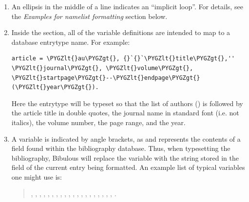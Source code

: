 \documentclass[letterpaper,10pt,english]{sphinxmanual}
\def\PYGZlt{\char`\<}
\def\PYGZgt{\char`\>}
\begin{document}
\begin{enumerate}
\item {} 
An ellipsis in the middle of a line indicates an ``implicit loop''. For details, see the \emph{Examples for namelist formatting} section below.

\item {} 
Inside the  section, all of the variable definitions are intended to map to a database entrytype name. For example:

\begin{Verbatim}[commandchars=\\\{\}]
article = \PYGZlt{}au\PYGZgt{}, {}`{}`\PYGZlt{}title\PYGZgt{},'' \PYGZlt{}journal\PYGZgt{}, \PYGZlt{}volume\PYGZgt{}, \PYGZlt{}startpage\PYGZgt{}--\PYGZlt{}endpage\PYGZgt{} (\PYGZlt{}year\PYGZgt{}).
\end{Verbatim}

Here the  entrytype will be typeset so that the list of authors () is followed by the article title in double quotes, the journal name in standard font (i.e. not italics), the volume number, the page range, and the year.

\item {} 
A variable is indicated by angle brackets, as  and represents the contents of a field found within the bibliography database. Thus, when typesetting the bibliography, Bibulous will replace the variable  with the string stored in the  field of the current entry being formatted. An example list of typical variables one might use is:
\begin{quote}

, , , , , , , , , , , , , , , , , , , , .
\end{quote}


\end{enumerate}
\end{document}
